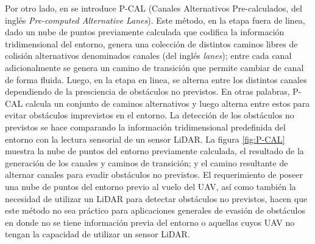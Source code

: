 Por otro lado, en \cite{Zhang2019} se introduce P-CAL (Canales Alternativos Pre-calculados, del inglés \textit{Pre-computed Alternative Lanes}). Este método, en la etapa fuera de linea, dado un nube de puntos previamente calculada que codifica la información tridimensional del entorno, genera una colección de distintos caminos libres de colisión alternativos denominados canales (del inglés \textit{lanes}); entre cada canal adicionalmente se genera un camino de transición que permite cambiar de canal de forma fluida. Luego, en la etapa en linea, se alterna entre los distintos canales dependiendo de la presciencia de obstáculos no previstos. En otras palabras, P-CAL calcula un conjunto de caminos alternativos y luego alterna entre estos para evitar obstáculos imprevistos en el entorno. La detección de los obstáculos no previstos se hace comparando la información tridimensional predefinida del entorno con la lectura sensorial de un sensor LiDAR. La figura \ref{fig:P-CAL} muestra la nube de puntos del entorno previamente calculada, el resultado de la generación de los canales y caminos de transición; y el camino resultante de alternar canales para evadir obstáculos no previstos. El requerimiento de poseer una nube de puntos del entorno previo al vuelo del UAV, así como también la necesidad de utilizar un LiDAR para detectar obstáculos no previstos, hacen que este método no sea práctico para aplicaciones generales de evasión de obstáculos en donde no se tiene información previa del entorno o aquellas cuyos UAV no tengan la capacidad de utilizar un sensor LiDAR. 

